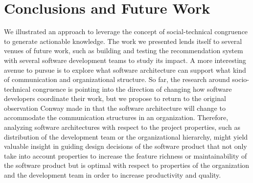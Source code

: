 \section{Conclusions and Future Work}
\label{ch:dis:con}
We illustrated an approach to leverage the concept of social-technical congruence to generate actionable knowledge.
%
%
The work we presented lends itself to several venues of future work, such as building and testing the recommendation system with several software development teams to study its impact.
A more interesting avenue to pursue is to explore what software architecture can support what kind of communication and organizational structure.
So far, the research around socio-technical congruence is pointing into the direction of changing how software developers coordinate their work, but we propose to return to the original observation Conway made in that the software architecture will change to accommodate the communication structures in an organization.
Therefore, analyzing software architectures with respect to the project properties, such as distribution of the development team or the organizational hierarchy, might yield valuable insight in guiding design decisions of the software product that not only take into account properties to increase the feature richness or maintainability of the software product but is optimal with respect to properties of the organization and the development team in order to increase productivity and quality. 
